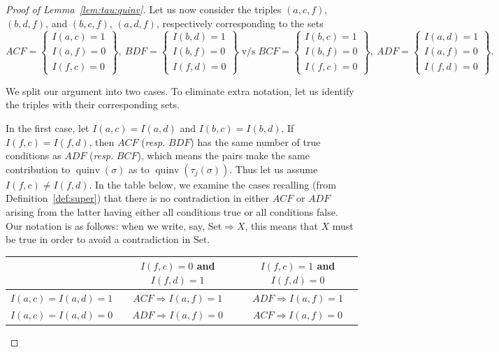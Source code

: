 \documentclass[11pt]{article}
\theoremstyle{definition}
\numberwithin{equation}{section}
\DeclareMathOperator{\quinv}{quinv}
\begin{document}
\begin{proof}[Proof of Lemma~\ref{lem:tau:quinv}]
Let us now consider the triples $(a,c,f)$, $(b,d,f)$, and $(b,c,f)$, $(a,d,f)$, respectively corresponding to the sets
{\scriptsize 
\[ 
ACF = \left\{\begin{matrix}I(a,c)=1\\I(a,f)=0\\I(f,c)=0 \end{matrix} \right\},\  
BDF = \left\{\begin{matrix}I(b,d)=1\\I(b,f)=0\\I(f,d)=0 \end{matrix} \right\} 
\; \mbox{v/s} \;
BCF = \left\{\begin{matrix}I(b,c)=1\\I(b,f)=0\\I(f,c)=0 \end{matrix} \right\},\ 
ADF = \left\{\begin{matrix}I(a,d)=1\\I(a,f)=0\\I(f,d)=0 \end{matrix} \right\}.
\]
}

We split our argument into two cases. To eliminate extra notation, let us identify the triples with their corresponding sets. 

In the first case, let $I(a,c)=I(a,d)$ and $I(b,c)=I(b,d)$. If $I(f,c)=I(f,d)$, then $ACF$ (\emph{resp.} $BDF$) has the same number of true conditions as $ADF$ (\emph{resp.} $BCF$), which means the pairs make the same contribution to $\quinv(\sigma)$ as to $\quinv(\tau_j(\sigma))$. Thus let us assume $I(f,c)\neq I(f,d)$. In the table below, we examine the cases recalling (from Definition~\ref{def:super}) that there is no contradiction in either $ACF$ or $ADF$ arising from the latter having either all conditions true or all conditions false. 
Our notation is as follows: when we write, say, $\text{Set} \Rightarrow X$, this means that $X$ must be true in order to avoid a contradiction in $\text{Set}$.


\begin{center}
{\renewcommand{\arraystretch}{1.2}
\flushleft
\footnotesize
\begin{tabular}{l|c|c|}
& $I(f,c)=0$ and $I(f,d)=1$ & $I(f,c)=1$ and $I(f,d)=0$\\ \hline
$I(a,c)=I(a,d)=1$ & $ACF \Rightarrow I(a,f)=1$ & $ADF \Rightarrow I(a,f)=1$ \\ \hline
$I(a,c)=I(a,d)=0$ & $ADF \Rightarrow I(a,f)=0$ & $ACF \Rightarrow I(a,f)=0$\\ \hline


\end{tabular}}
\end{center}
\end{proof}
\end{document}
